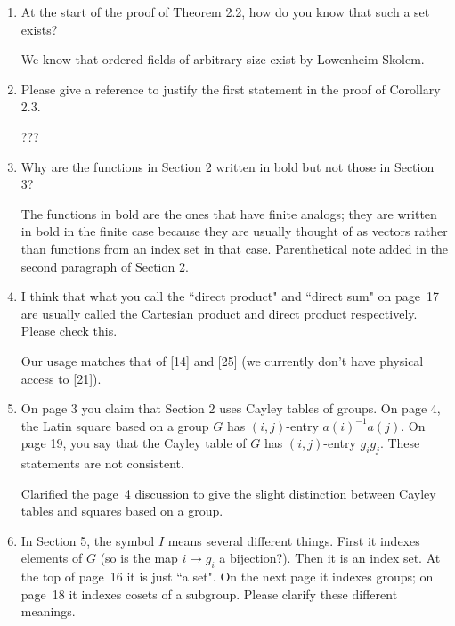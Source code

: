 \documentclass[12pt,a4paper]{article}
\newenvironment{QandA}{\begin{enumerate}[label=\bfseries\alph*.]\bfseries}
                      {\end{enumerate}}
\newenvironment{answered}{\par\normalfont}{}
\begin{document}
\begin{QandA}

\item At the start of the proof of Theorem 2.2, how do you know that such a set exists? 

\begin{answered}
We know that ordered fields of arbitrary size exist by Lowenheim-Skolem. 
\end{answered}

\item Please give a reference to justify the first statement in the proof of Corollary 2.3.

\begin{answered}
???
\end{answered}

\item Why are the functions in Section 2 written in bold but not those in Section 3?

\begin{answered}
The functions in bold are the ones that have finite analogs; they are written in bold in the finite case because they are usually thought of as vectors rather than functions from an index set in that case.  Parenthetical note added in the second paragraph of Section 2.
\end{answered}

\item I think that what you call the ``direct product" and ``direct sum" on page~17 are usually called the Cartesian product and direct product respectively. Please check this.

\begin{answered}
Our usage matches that of [14] and [25] (we currently don't have physical access to [21]).
\end{answered}



\item On page 3 you claim that Section 2 uses Cayley tables of groups. On page 4, the Latin square based on a group $G$ has $(i,j)$-entry $a(i)^{-1} a(j)$. On page 19, you say that the Cayley table of $G$ has $(i,j)$-entry $g_ig_j$. These statements are not consistent.

\begin{answered}
Clarified the page~4 discussion to give the slight distinction between Cayley tables and squares based on a group.  
\end{answered}


\item In Section 5, the symbol $I$ means several different things. First it indexes elements of $G$ (so is the map $i \mapsto g_i$ a bijection?). Then it is an index set. At the top of page~16 it is just ``a set". On the next page it indexes groups; on page~18 it indexes cosets of a subgroup. Please clarify these different meanings.



\end{QandA}
\end{document}
